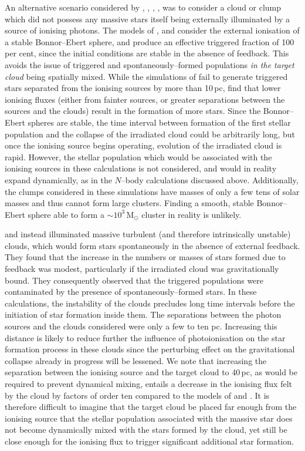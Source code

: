\documentclass[useAMS,usenatbib,usegraphicx]{mn2e}
\begin{document}
An alternative scenario considered by \cite{Dale07a}, \cite{Dale12a}, \cite{Gritschneder09}, \cite{Bisbas11}, \cite{Ngoumou15} was to consider a cloud or clump which did not possess any massive stars itself being externally illuminated by a source of ionising photons. The models of \cite{Gritschneder09}, \cite{Bisbas11} and \cite{Ngoumou15} consider the external ionisation of a stable Bonnor--Ebert sphere, and produce an effective triggered fraction of 100\,per cent, since the initial conditions are stable in the absence of feedback. This avoids the issue of triggered and spontaneously--formed populations \textit{in the target cloud} being spatially mixed. While the simulations of \cite{Dale13b} fail to generate triggered stars separated from the ionising sources by more than 10\,pc, \cite{Bisbas11} find that lower ionising fluxes (either from fainter sources, or greater separations between the sources and the clouds) result in the formation of more stars. Since the Bonnor--Ebert spheres are stable, the time interval between formation of the first stellar population and the collapse of the irradiated cloud could be arbitrarily long, but once the ionising source begins operating, evolution of the irradiated cloud is rapid. However, the stellar population which would be associated with the ionising sources in these calculations is not considered, and would in reality expand dynamically, as in the $N$--body calculations discussed above. Additionally, the clumps considered in these simulations have masses of only a few tens of solar masses and thus cannot form large clusters. Finding a smooth, stable Bonnor--Ebert sphere able to form a $\sim10^{3}$\,M$_{\odot}$ cluster in reality is unlikely.

\cite{Dale07a} and \cite{Dale12a} instead illuminated massive turbulent (and therefore intrinsically unstable) clouds, which would form stars spontaneously in the absence of external feedback. They found that the increase in the numbers or masses of stars formed due to feedback was modest, particularly if the irradiated cloud was gravitationally bound. They consequently observed that the triggered populations were contaminated by the presence of spontaneously--formed stars. In these calculations, the instability of the clouds precludes long time intervals before the initiation of star formation inside them. The separations between the photon sources and the clouds considered were only a few to ten pc. Increasing this distance is likely to reduce further the influence of photoionisation on the star formation process in these clouds since the perturbing effect on the gravitational collapse already in progress will be lessened. We note that increasing the separation between the ionising source and the target cloud to 40\,pc, as would be required to prevent dynamical mixing, entails a decrease in the ionising flux felt by the cloud by factors of order ten compared to the models of \cite{Dale07a} and \cite{Dale12a}. It is therefore difficult to imagine that the target cloud be placed far enough from the ionising source that the stellar population associated with the massive star does not become dynamically mixed with the stars formed by the cloud, yet still be close enough for the ionising flux to trigger significant additional star formation.
\end{document}
